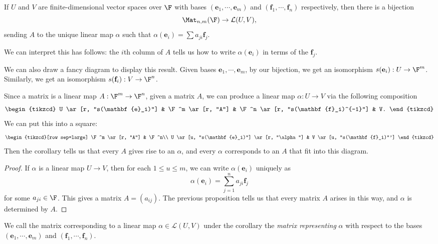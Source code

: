 \documentclass[a4paper]{article}
\begin{document}
\begin{cor}
  If $U$ and $V$ are finite-dimensional vector spaces over $\F$ with bases $(\mathbf{e}_1, \cdots, \mathbf{e}_m)$ and $(\mathbf{f}_1, \cdots, \mathbf{f}_n)$ respectively, then there is a bijection
  \[
    \Mat_{n, m}(\F) \to \mathcal{L}(U, V),
  \]
  sending $A$ to the unique linear map $\alpha$ such that $\alpha(\mathbf{e}_i) = \sum a_{ji} \mathbf{f}_j$.
\end{cor}
We can interpret this has follows: the $i$th column of $A$ tells us how to write $\alpha (\mathbf{e}_i)$ in terms of the $\mathbf{f}_j$.

We can also draw a fancy diagram to display this result. Given bases $\mathbf{e}_1, \cdots, \mathbf{e}_m$, by our bijection, we get an isomorphism $s(\mathbf{e}_i): U\to \F^m$. Similarly, we get an isomorphism $s(\mathbf{f}_i): V\to \F^n$.

Since a matrix is a linear map $A: \F^m \to \F^n$, given a matrix $A$, we can produce a linear map $\alpha: U\to V$ via the following composition
\[
  \begin{tikzcd}
    U \ar[r, "s(\mathbf{e}_i)"] & \F^m \ar[r, "A"] & \F^n \ar[r, "s(\mathbf{f}_i)^{-1}"] & V.
  \end{tikzcd}
\]
We can put this into a square:
\[
  \begin{tikzcd}[row sep=large]
    \F^m \ar[r, "A"] & \F^n\\
    U \ar[u, "s(\mathbf{e}_i)"] \ar[r, "\alpha"] & V \ar[u, "s(\mathbf{f}_i)"']
  \end{tikzcd}
\]
Then the corollary tells us that every $A$ gives rise to an $\alpha$, and every $\alpha$ corresponds to an $A$ that fit into this diagram.
\begin{proof}
  If $\alpha$ is a linear map $U \to V$, then for each $1 \leq u \leq m$, we can write $\alpha(\mathbf{e}_i)$ uniquely as
  \[
    \alpha(\mathbf{e}_i) = \sum_{j = 1}^n a_{ji} \mathbf{f}_j
  \]
  for some $a_{ji} \in \F$. This gives a matrix $A = (a_{ij})$. The previous proposition tells us that every matrix $A$ arises in this way, and $\alpha$ is determined by $A$.
\end{proof}

\begin{defi}
  We call the matrix corresponding to a linear map $\alpha\in \mathcal{L}(U, V)$ under the corollary the \emph{matrix representing} $\alpha$ with respect to the bases $(\mathbf{e}_1, \cdots, \mathbf{e}_m)$ and $(\mathbf{f}_1, \cdots, \mathbf{f}_n)$.
\end{defi}
\end{document}

